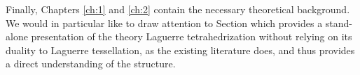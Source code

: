 Finally, Chapters \ref{ch:1} and \ref{ch:2} contain the necessary theoretical background. We would in particular like to draw attention to Section \label{sec:Laguerre} which provides a stand-alone presentation of the theory Laguerre tetrahedrization without relying on its duality to Laguerre tessellation, as the existing literature does, and thus provides a direct understanding of the structure. 


